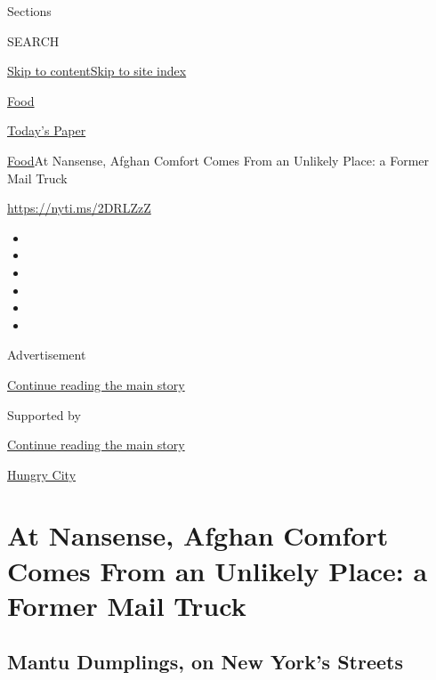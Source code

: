 Sections

SEARCH

\protect\hyperlink{site-content}{Skip to
content}\protect\hyperlink{site-index}{Skip to site index}

\href{https://www.nytimes3xbfgragh.onion/section/food}{Food}

\href{https://myaccount.nytimes3xbfgragh.onion/auth/login?response_type=cookie\&client_id=vi}{}

\href{https://www.nytimes3xbfgragh.onion/section/todayspaper}{Today's
Paper}

\href{/section/food}{Food}\textbar{}At Nansense, Afghan Comfort Comes
From an Unlikely Place: a Former Mail Truck

\url{https://nyti.ms/2DRLZzZ}

\begin{itemize}
\item
\item
\item
\item
\item
\item
\end{itemize}

Advertisement

\protect\hyperlink{after-top}{Continue reading the main story}

Supported by

\protect\hyperlink{after-sponsor}{Continue reading the main story}

\href{/column/hungry-city}{Hungry City}

\hypertarget{at-nansense-afghan-comfort-comes-from-an-unlikely-place-a-former-mail-truck}{%
\section{At Nansense, Afghan Comfort Comes From an Unlikely Place: a
Former Mail
Truck}\label{at-nansense-afghan-comfort-comes-from-an-unlikely-place-a-former-mail-truck}}

\href{https://www.nytimes3xbfgragh.onion/slideshow/2018/11/29/dining/nansense-food-truck-brooklyn.html}{}

\hypertarget{mantu-dumplings-on-new-yorks-streets}{%
\subsection{Mantu Dumplings, on New York's
Streets}\label{mantu-dumplings-on-new-yorks-streets}}

